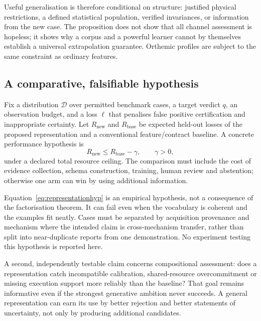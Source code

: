 Useful generalisation is therefore conditional on structure: justified physical restrictions, a defined statistical population, verified invariances, or information from the new case. The proposition does not show that all channel assessment is hopeless; it shows why a corpus and a powerful learner cannot by themselves establish a universal extrapolation guarantee. Orthemic profiles are subject to the same constraint as ordinary features.

\subsection{A comparative, falsifiable hypothesis}
Fix a distribution $\mathcal D$ over permitted benchmark cases, a target verdict $q$, an observation budget, and a loss $\ell$ that penalises false positive certification and inappropriate certainty. Let $R_{\mathrm{new}}$ and $R_{\mathrm{base}}$ be expected held-out losses of the proposed representation and a conventional feature/contract baseline. A concrete performance hypothesis is
\begin{equation}\label{eq:representationhyp}
 R_{\mathrm{new}}\leq R_{\mathrm{base}}-\gamma,
 \qquad \gamma>0,
\end{equation}
under a declared total resource ceiling. The comparison must include the cost of evidence collection, schema construction, training, human review and abstention; otherwise one arm can win by using additional information.

Equation~\eqref{eq:representationhyp} is an empirical hypothesis, not a consequence of the factorisation theorem. It can fail even when the vocabulary is coherent and the examples fit neatly. Cases must be separated by acquisition provenance and mechanism where the intended claim is cross-mechanism transfer, rather than split into near-duplicate reports from one demonstration. No experiment testing this hypothesis is reported here.

A second, independently testable claim concerns compositional assessment: does a representation catch incompatible calibration, shared-resource overcommitment or missing execution support more reliably than the baseline? That goal remains informative even if the strongest generative ambition never succeeds. A general representation can earn its use by better rejection and better statements of uncertainty, not only by producing additional candidates.
